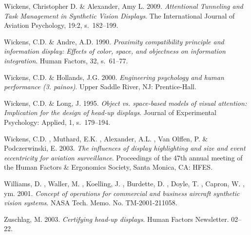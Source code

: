 \documentclass[utf8,bachelor,manualbib]{gradu3}
\begin{document}
\begin{thebibliography}{}
Wickens, Christopher D. \& Alexander, Amy L. 2009.
\textit{Attentional Tunneling and Task Management in Synthetic Vision Displays}.
The International Journal of Aviation Psychology, 19:2, s.~182--199.

Wickens, C.D. \& Andre, A.D. 1990.
\textit{Proximity compatibility principle and information display: Effects
of color, space, and objectness on information integration}.
Human Factors, 32, s.~61--77.

Wickens, C.D. \& Hollands, J.G. 2000.
\textit{Engineering psychology and human performance (3. painos)}.
Upper Saddle River, NJ: Prentice-Hall.

Wickens, C.D. \& Long, J. 1995.
\textit{Object vs. space-based models of visual attention: Implication for the design of head-up displays}.
Journal of Experimental Psychology: Applied, 1, s.~179--194.

Wickens, C.D. , Muthard, E.K. , Alexander, A.L. , Van Olffen, P. \& Podczerwinski, E. 2003.
\textit{The influences of display highlighting and size and event eccentricity for aviation surveillance}.
Proceedings of the 47th annual meeting of the Human Factors \& Ergonomics Society, Santa Monica, CA: HFES.

Williams, D. , Waller, M. , Koelling, J. , Burdette, D. , Doyle, T. , Capron, W. , ym. 2001.
\textit{Concept of operations for commercial and business aircraft synthetic vision systems}.
NASA Tech. Memo. No. TM-2001-211058.

Zuschlag, M. 2003.
\textit{Certifying head-up displays}.
Human Factors Newsletter. 02--22.

\end{thebibliography}
\end{document}
